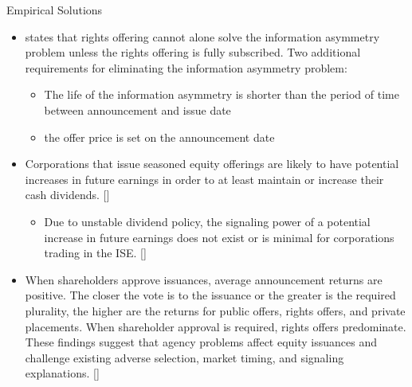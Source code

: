 \documentclass{beamer}
\begin{document}
	\begin{frame}{Empirical Solutions}
		\begin{itemize}
			\tiny
			\item \cite{loderer1988stock} states that rights offering cannot alone solve the  information asymmetry problem unless the rights offering is fully subscribed. Two additional requirements for eliminating the information asymmetry problem:
			\begin{itemize}\tiny
				\item The life of the information asymmetry is shorter than the period of time
				between announcement and issue date
				\item  the offer price is set on the announcement date
			\end{itemize}
			\item Corporations that  issue seasoned equity offerings are likely to have potential increases in future earnings in order to at least maintain or increase their cash dividends. [\cite{lasfer1997motivation}]
			\begin{itemize}\tiny
				\item Due to unstable dividend policy, the signaling power of a potential increase in future earnings does not exist or is minimal
				for corporations trading in the ISE. [\cite{adaoglu2006market}]
			\end{itemize}
			\item 
			When shareholders approve issuances, average announcement returns are positive. The closer the vote is to the issuance or the greater is the required plurality, the higher
			are the returns for public offers, rights offers, and private placements. When shareholder
			approval is required, rights offers predominate. These findings suggest that agency problems affect equity issuances and challenge existing adverse selection, market timing, and signaling explanations. [\cite{holderness2018equity}]
		\end{itemize}
	\end{frame}
	
\end{document}
